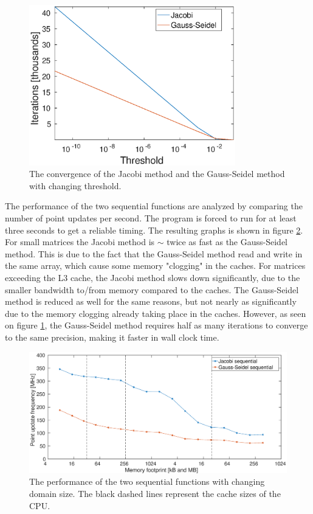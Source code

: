 \begin{figure}
\centering
\includegraphics[width = 0.8\textwidth]{fig/itd_jac_gs.eps}
\caption{The convergence of the Jacobi method and the Gauss-Seidel method with changing threshold.}
\label{fig:itd}
\end{figure}

The performance of the two sequential functions are analyzed by comparing the number of point updates per second. The program is forced to run for at least three seconds to get a reliable timing. The resulting graphs is shown in figure \ref{fig:seq_perf}. For small matrices the Jacobi method is $\sim$ twice as fast as the Gauss-Seidel method. This is due to the fact that the Gauss-Seidel method read and write in the same array, which cause some memory "clogging" in the caches. For matrices exceeding the L3 cache, the Jacobi method slows down significantly, due to the smaller bandwidth to/from memory compared to the caches. The Gauss-Seidel method is reduced as well for the same reasons, but not nearly as significantly due to the memory clogging already taking place in the caches. However, as seen on figure \ref{fig:itd}, the Gauss-Seidel method requires half as many iterations to converge to the same precision, making it faster in wall clock time.

\begin{figure}
\centering
\includegraphics[width = 1.1\textwidth]{fig/seq_perf.eps}
\caption{The performance of the two sequential functions with changing domain size. The black dashed lines represent the cache sizes of the CPU.}
\label{fig:seq_perf}
\end{figure}